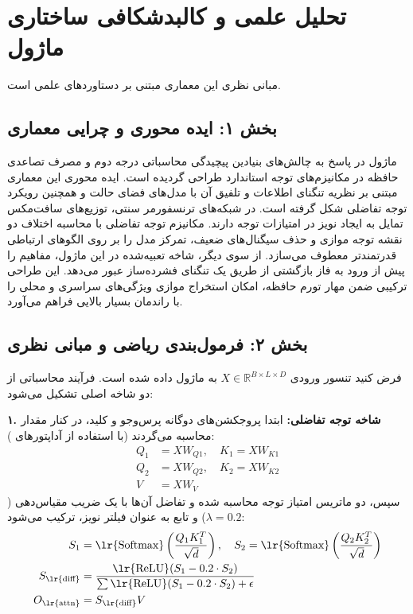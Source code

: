 \section{تحلیل علمی و کالبدشکافی ساختاری ماژول }

مبانی نظری این معماری مبتنی بر دستاوردهای علمی \cite{vaswani2017attention} است.

\subsection*{بخش ۱: ایده محوری و چرایی معماری }
ماژول  در پاسخ به چالش‌های بنیادین پیچیدگی محاسباتی درجه دوم و مصرف تصاعدی حافظه در مکانیزم‌های توجه استاندارد طراحی گردیده است. ایده محوری این معماری مبتنی بر نظریه تنگنای اطلاعات  و تلفیق آن با مدل‌های فضای حالت  و همچنین رویکرد توجه تفاضلی  شکل گرفته است. در شبکه‌های ترنسفورمر سنتی، توزیع‌های سافت‌مکس تمایل به ایجاد نویز در امتیازات توجه دارند. مکانیزم توجه تفاضلی با محاسبه اختلاف دو نقشه توجه موازی و حذف سيگنال‌های ضعیف، تمرکز مدل را بر روی الگوهای ارتباطی قدرتمندتر معطوف می‌سازد. از سوی دیگر، شاخه  تعبیه‌شده در این ماژول، مفاهیم را پیش از ورود به فاز بازگشتی از طریق یک تنگنای فشرده‌ساز عبور می‌دهد. این طراحی ترکیبی  ضمن مهار تورم حافظه، امکان استخراج موازی ویژگی‌های سراسری و محلی را با راندمان بسیار بالایی فراهم می‌آورد.

\subsection*{بخش ۲: فرمول‌بندی ریاضی و مبانی نظری }
فرض کنید تنسور ورودی $X \in \mathbb{R}^{B \times L \times D}$ به ماژول داده شده است. فرآیند محاسباتی از دو شاخه اصلی تشکیل می‌شود:

\textbf{۱. شاخه توجه تفاضلی:}
ابتدا پروجکشن‌های دوگانه پرس‌وجو و کلید، در کنار مقدار محاسبه می‌گردند (با استفاده از آداپتورهای ):
\begin{align}
    Q_1 &= X W_{Q1}, \quad K_1 = X W_{K1} \\
    Q_2 &= X W_{Q2}, \quad K_2 = X W_{K2} \\
    V &= X W_V
\end{align}
سپس، دو ماتریس امتیاز توجه محاسبه شده و تفاضل آن‌ها با یک ضریب مقیاس‌دهی ($\lambda = 0.2$) و تابع  به عنوان فیلتر نویز، ترکیب می‌شود:
\begin{align}
    S_1 &= \text{\lr{Softmax}}\left(\frac{Q_1 K_1^T}{\sqrt{d}}\right), \quad S_2 = \text{\lr{Softmax}}\left(\frac{Q_2 K_2^T}{\sqrt{d}}\right) \\
    S_{\text{\lr{diff}}} &= \frac{\text{\lr{ReLU}}(S_1 - 0.2 \cdot S_2)}{\sum \text{\lr{ReLU}}(S_1 - 0.2 \cdot S_2) + \epsilon} \\
    O_{\text{\lr{attn}}} &= S_{\text{\lr{diff}}} V
\end{align}

